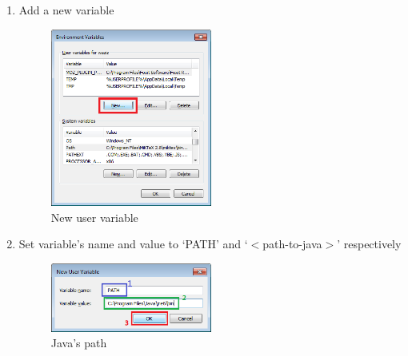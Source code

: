\begin{enumerate}
\begin{enumerate}
		\item Add a new variable
		\begin{figure}[H]\label{fig:newvar}
		\centering
		\includegraphics[width=0.5\textwidth]{img/step-by-step-win/6-new-variable}
		\caption{New user variable}
		\end{figure}
		
		\item Set variable's name and value to `PATH' and `$<$path-to-java$>$' respectively
		\begin{figure}[H]\label{fig:path}
		\centering
		\includegraphics[width=0.5\textwidth]{img/step-by-step-win/7-set-path}
		\caption{Java's path}
		\end{figure}
		

\end{enumerate}
\end{enumerate}
